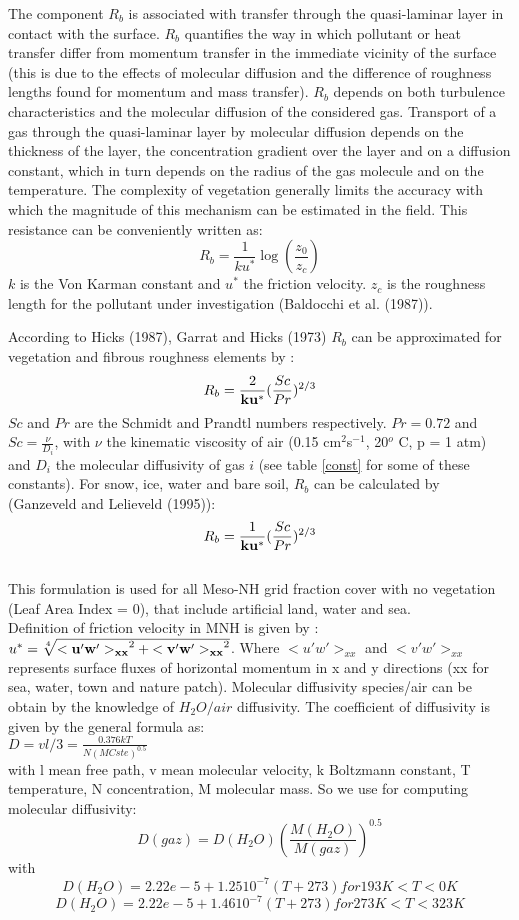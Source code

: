 The component $R_b$ is associated with transfer through the quasi-laminar 
layer in contact with the surface. $R_b$ quantifies the way in which pollutant
or heat transfer differ from momentum transfer in the immediate vicinity of the
surface (this is due to the effects of molecular diffusion and the difference 
of roughness lengths found for momentum and mass transfer). 
$R_b$ depends on both turbulence characteristics and the molecular
diffusion of the considered gas. Transport of a gas through the
quasi-laminar layer by molecular diffusion depends on the thickness of the
layer, the concentration gradient over the layer and on a diffusion constant,
which in turn depends on the radius of the gas molecule and on the temperature.
The complexity of vegetation generally limits the accuracy with which the
magnitude of this mechanism can be estimated in the field. This resistance can
be conveniently written as:
\[ R_b=\frac{1}{k u^*} \log (\frac{z_0}{z_c})\]
$k$ is the Von Karman constant and $u^*$ the friction velocity.
$z_c$ is the roughness length for the pollutant under investigation (Baldocchi et al. (1987)). 

According to Hicks \etal (1987)\nocite{Hicks1987}, Garrat and Hicks (1973)\nocite{Garrat1973}
$R_b$ can be approximated for vegetation and fibrous roughness elements by :
\[ R_b = \frac{2}{\bf{k} \bf{u^*}}(\frac{Sc}{Pr})^{2/3} \]
$Sc$ and $Pr$ are the Schmidt and Prandtl numbers respectively.
$Pr=0.72$ and $Sc=\frac{\nu}{D_i}$, with $\nu$ the kinematic viscosity of
air (0.15 cm$^2$s$^{-1}$, 20$^o$ C, p = 1 atm) and $D_i$ the molecular
diffusivity of gas $i$ (see table \ref{const} for some of these
constants). 
For snow, ice, water and bare soil, $R_b$ can be calculated by (Ganzeveld and Lelieveld (1995)\nocite{Ganzeveld1995}):\[ R_b =
\frac{1}{\bf{k} \bf{u^*}}(\frac{Sc}{Pr})^{2/3} \]\\
This formulation is used for all Meso-NH grid fraction cover with no
vegetation (Leaf Area Index = 0), that include artificial land, water
and sea.\\
Definition of friction velocity in MNH is given by : $u^* =
\sqrt[4]{{\bf {<u'w'>}_{xx}}^2+{\bf{<v'w'>}_{xx}}^2}$. Where $<u'w'>_{xx}$ and
$<v'w'>_{xx}$ represents   
surface fluxes of horizontal momentum in x and y directions (xx for sea,
water, town and nature patch).
Molecular diffusivity species/air  can be obtain by the knowledge of $H_2O/air$ diffusivity.
The coefficient of diffusivity is given by the general formula as:\\
$D = v l /3 = \frac{0.376 k T}{N (M Cste)^{0.5}}$\\
with
l mean free path,
v mean molecular velocity,
k Boltzmann constant,
T temperature,
N concentration,
M molecular mass.
So we use for computing molecular diffusivity: \\ 
$$
D(gaz)=D(H_2O) \left(\frac{M(H_2O)}{M(gaz)} \right)^{0.5}
$$
with 
$$
D(H_2O)= 2.22e-5 + 1.25 10^{-7} (T + 273)  for 193 K < T < 0 K
$$
$$
D(H_2O)= 2.22e-5 + 1.46 10^{-7} (T + 273)  for 273 K < T < 323 K 
$$

